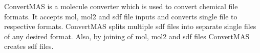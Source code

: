 ConvertMAS is a molecule converter which is used to convert chemical file formats. It accepts mol, mol2 and sdf file inputs and converts single file to respective formats. ConvertMAS splits multiple sdf files into separate single files of any desired format. Also, by joining of mol, mol2 and sdf files ConvertMAS creates sdf files. 